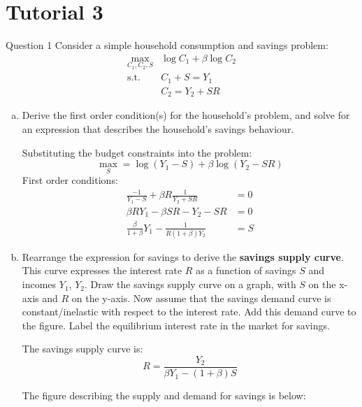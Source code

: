 \documentclass[a4paper]{article}
\newif\IfInSansMode
\begin{document}
\section{Tutorial 3}
	\begin{questionbox}{Question 1}
		Consider a simple household consumption and savings problem:
		\begin{align*}
			\max_{C_1,C_2,S} & \log C_1 + \beta \log C_2 \\
			\text{s.t. } & C_1 + S = Y_1 \\
			& C_2 = Y_2 + SR
		\end{align*}
		\begin{enumerate}[(a)]
			\item Derive the first order condition(s) for the household's problem, and solve for an expression that describes the household's savings behaviour.
			\begin{explanationbox}
					Substituting the budget constraints into the problem:
					\[
						\max_S = \log(Y_1 - S) + \beta \log (Y_2 - SR)
					\]
					First order conditions:
					\begin{align*}
						\frac{-1}{Y_1-S} + \beta R \frac{1}{Y_2 + SR} &= 0\\
						\beta RY_1 - \beta SR - Y_2 - SR &= 0\\
						\frac{\beta}{1+\beta} Y_1 - \frac{1}{R(1+\beta)Y_2} &=S
					\end{align*}
			\end{explanationbox}
			\item Rearrange the expression for savings to derive the \textbf{savings supply curve}. This curve expresses the interest rate \( R \) as a function of savings \( S \) and incomes \( Y_1 \), \( Y_2 \). Draw the savings supply curve on a graph, with \( S \) on the x-axis and \( R \) on the y-axis. Now assume that the savings demand curve is constant/inelastic with respect to the interest rate. Add this demand curve to the figure. Label the equilibrium interest rate in the market for savings.
			\begin{explanationbox}
				The savings supply curve is:
				\[
					R = \frac{Y_2}{\beta Y_1 - (1+\beta) S}
				\]
			\end{explanationbox}
			\begin{explanationbox}
				The figure describing the supply and demand for savings is below:
				\begin{figure}[H]
					\centering
\end{figure}
\end{explanationbox}
\end{enumerate}
\end{questionbox}
\end{document}
